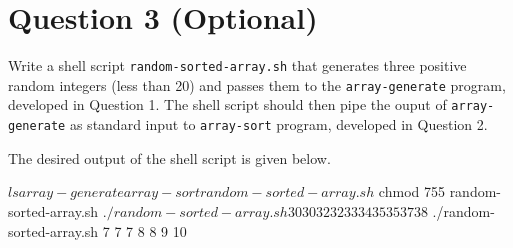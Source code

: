 
\section*{Question 3 (Optional)}

Write a shell script \texttt{random-sorted-array.sh} that generates three positive random integers (less than 20) and passes them to the \texttt{array-generate} program, developed in Question 1.
The shell script should then pipe the ouput of \texttt{array-generate} as standard input to \texttt{array-sort} program, developed in Question 2.

The desired output of the shell script is given below.

\begin{terminal}
$ ls
array-generate array-sort random-sorted-array.sh
$ chmod 755 random-sorted-array.sh
$ ./random-sorted-array.sh
30 30 32 32 33 34 35 35 37 38
$ ./random-sorted-array.sh
7 7 7 8 8 9 10
\end{terminal}
